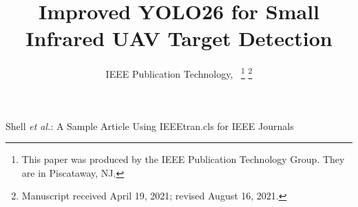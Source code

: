 \documentclass[lettersize,journal]{IEEEtran}
\begin{document}
\title{Improved YOLO26 for Small Infrared UAV Target Detection}

\author{IEEE Publication Technology,~
\thanks{This paper was produced by the IEEE Publication Technology Group. They are in Piscataway, NJ.}%
\thanks{Manuscript received April 19, 2021; revised August 16, 2021.}}

%
{Shell \MakeLowercase{\textit{et al.}}: A Sample Article Using IEEEtran.cls for IEEE Journals}


\maketitle




\end{document}
